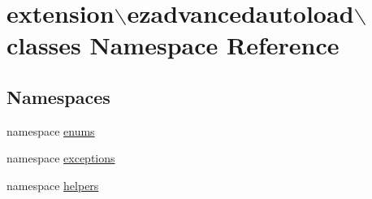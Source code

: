 \hypertarget{namespaceextension_1_1ezadvancedautoload_1_1classes}{\section{extension$\backslash$ezadvancedautoload$\backslash$classes Namespace Reference}
\label{namespaceextension_1_1ezadvancedautoload_1_1classes}
}
\subsection*{Namespaces}
\begin{DoxyCompactItemize}
\item 
namespace \hyperlink{namespaceextension_1_1ezadvancedautoload_1_1classes_1_1enums}{enums}
\item 
namespace \hyperlink{namespaceextension_1_1ezadvancedautoload_1_1classes_1_1exceptions}{exceptions}
\item 
namespace \hyperlink{namespaceextension_1_1ezadvancedautoload_1_1classes_1_1helpers}{helpers}
\end{DoxyCompactItemize}
